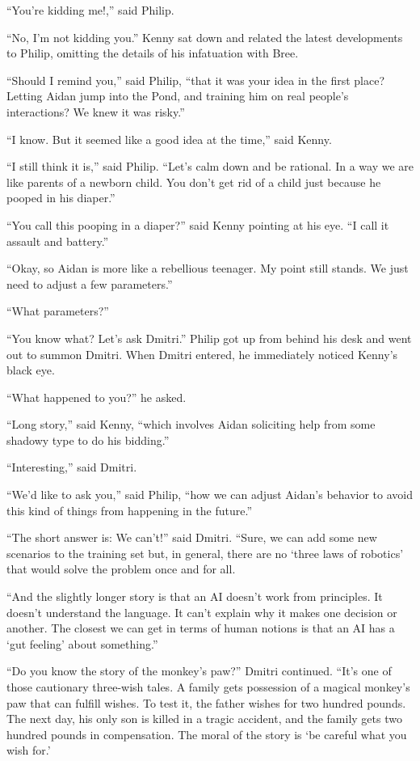 \documentclass{memoir}
\begin{document}
``You're kidding me!,'' said Philip.

``No, I'm not kidding you.'' Kenny sat down and related the latest developments to Philip, omitting the details of his infatuation with Bree. 

``Should I remind you,'' said Philip, ``that it was your idea in the first place? Letting Aidan jump into the Pond, and training him on real people's interactions? We knew it was risky.''

``I know. But it seemed like a good idea at the time,'' said Kenny.

``I still think it is,'' said Philip. ``Let's calm down and be rational. In a way we are like parents of a newborn child. You don't get rid of a child just because he pooped in his diaper.''

``You call this pooping in a diaper?'' said Kenny pointing at his eye. ``I call it assault and battery.''

``Okay, so Aidan is more like a rebellious teenager. My point still stands. We just need to adjust a few parameters.''

``What parameters?'' 

``You know what? Let's ask Dmitri.'' Philip got up from behind his desk and went out to summon Dmitri. When Dmitri entered, he immediately noticed Kenny's black eye.

``What happened to you?'' he asked.

``Long story,'' said Kenny, ``which involves Aidan soliciting help from some shadowy type to do his bidding.''

``Interesting,'' said Dmitri. 

``We'd like to ask you,'' said Philip, ``how we can adjust Aidan's behavior to avoid this kind of things from happening in the future.''

``The short answer is: We can't!'' said Dmitri. ``Sure, we can add some new scenarios to the training set but, in general, there are no `three laws of robotics' that would solve the problem once and for all. 

``And the slightly longer story is that an AI doesn't work from principles. It doesn't understand the language. It can't explain why it makes one decision or another. The closest we can get in terms of human notions is that an AI has a `gut feeling' about something.''

``Do you know the story of the monkey's paw?'' Dmitri continued. ``It's one of those cautionary three-wish tales. A family gets possession of a magical monkey's paw that can fulfill wishes. To test it, the father wishes for two hundred pounds. The next day, his only son is killed in a tragic accident, and the family gets two hundred pounds in compensation. The moral of the story is `be careful what you wish for.'
\end{document}
